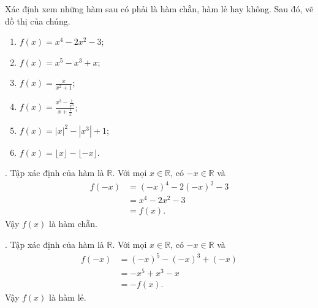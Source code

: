 \exercise Xác định xem những hàm sau có phải là hàm chẵn, hàm lẻ hay không. Sau đó, vẽ đồ thị của chúng.
\begin{multicols}{2}
   \begin{enumerate}
      \item $f(x) = x^4 - 2x^2 - 3$;
      \item $f(x) = x^5 - x^3 + x$;
      \item $f(x) = \frac{x}{x^2 + 1}$;
      \item $f(x) = \frac{x^3 - \frac{1}{x^3}}{x + \frac{1}{x}}$;
      \item $f(x) = |x|^2 - \left|x^3\right| + 1$;
      \item $f(x) = \lfloor x \rfloor - \lfloor -x \rfloor$.
   \end{enumerate}
\end{multicols}

\solution 

\setcounter{subexercise}{1}
. Tập xác định của hàm là $\mathbb{R}$. Với mọi $x \in \mathbb{R}$, có $-x \in \mathbb{R}$ và
\begin{align*}
   f(-x) &= (-x)^4 - 2(-x)^2 - 3\\
   &= x^4 - 2x^2 - 3\\
   &= f(x).
\end{align*}
Vậy $f(x)$ là hàm chẵn.

. Tập xác định của hàm là $\mathbb{R}$. Với mọi $x \in \mathbb{R}$, có $-x \in \mathbb{R}$ và
\begin{align*}
   f(-x) &= (-x)^5 - (-x)^3 + (-x)\\
   &= -x^5 + x^3 - x\\
   &= -f(x).
\end{align*}
Vậy $f(x)$ là hàm lẻ.

